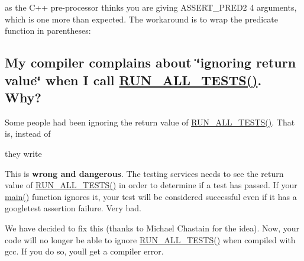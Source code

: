 \begin{DoxyCode}{0}
\end{DoxyCode}


as the C++ pre-\/processor thinks you are giving {\ttfamily A\+S\+S\+E\+R\+T\+\_\+\+P\+R\+E\+D2} 4 arguments, which is one more than expected. The workaround is to wrap the predicate function in parentheses\+:


\begin{DoxyCode}{0}
\end{DoxyCode}


\subsection*{My compiler complains about \char`\"{}ignoring return value\char`\"{} when I call \mbox{\hyperlink{gtest_8h_a853a3792807489591d3d4a2f2ff9359f}{R\+U\+N\+\_\+\+A\+L\+L\+\_\+\+T\+E\+S\+T\+S()}}. Why?}

Some people had been ignoring the return value of {\ttfamily \mbox{\hyperlink{gtest_8h_a853a3792807489591d3d4a2f2ff9359f}{R\+U\+N\+\_\+\+A\+L\+L\+\_\+\+T\+E\+S\+T\+S()}}}. That is, instead of


\begin{DoxyCode}{0}
\end{DoxyCode}


they write


\begin{DoxyCode}{0}
\end{DoxyCode}


This is {\bfseries{wrong and dangerous}}. The testing services needs to see the return value of {\ttfamily \mbox{\hyperlink{gtest_8h_a853a3792807489591d3d4a2f2ff9359f}{R\+U\+N\+\_\+\+A\+L\+L\+\_\+\+T\+E\+S\+T\+S()}}} in order to determine if a test has passed. If your {\ttfamily \mbox{\hyperlink{3_814_83_2CompilerIdC_2CMakeCCompilerId_8c_a0ddf1224851353fc92bfbff6f499fa97}{main()}}} function ignores it, your test will be considered successful even if it has a googletest assertion failure. Very bad.

We have decided to fix this (thanks to Michael Chastain for the idea). Now, your code will no longer be able to ignore {\ttfamily \mbox{\hyperlink{gtest_8h_a853a3792807489591d3d4a2f2ff9359f}{R\+U\+N\+\_\+\+A\+L\+L\+\_\+\+T\+E\+S\+T\+S()}}} when compiled with {\ttfamily gcc}. If you do so, you\textquotesingle{}ll get a compiler error.

